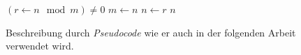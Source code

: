 \begin{figure}
    \centering
    \begin{codebox}
        \li \While $(r \gets n \mod m) \neq 0$
        \li     \Do
                    $m \gets n$                 \label{ln:euclid-while-begin}
        \li         $n \gets r$                 \label{ln:euclid-while-end}
                \End
        \li \Return $n$                         \label{ln:euclid-return}
    \end{codebox}
    \caption{Beschreibung durch \emph{Pseudocode} wie er auch in der folgenden Arbeit verwendet wird.}
    \label{fig:pseudocode-algorithm-specification}
\end{figure}